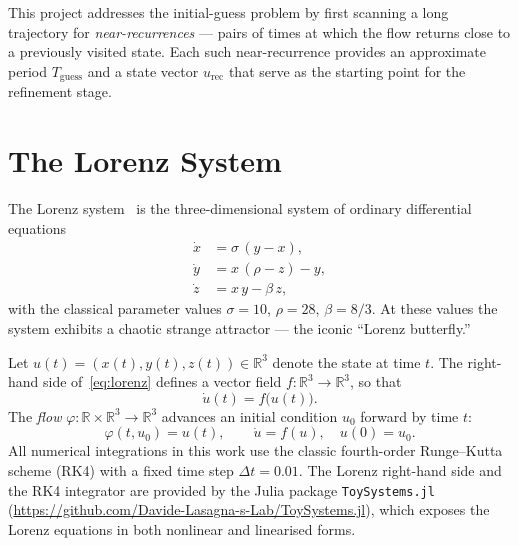 \documentclass[11pt,a4paper]{article}
\begin{document}
This project addresses the initial-guess problem by first scanning a long
trajectory for \emph{near-recurrences} --- pairs of times at which the flow
returns close to a previously visited state.  Each such near-recurrence
provides an approximate period $T_{\text{guess}}$ and a state vector
$u_{\text{rec}}$ that serve as the starting point for the refinement
stage.

\section{The Lorenz System}

The Lorenz system~\cite{lorenz1963deterministic} is the three-dimensional
system of ordinary differential equations
\begin{equation}\label{eq:lorenz}
\begin{aligned}
  \dot{x} &= \sigma\,(y - x), \\
  \dot{y} &= x\,(\rho - z) - y, \\
  \dot{z} &= x\,y - \beta\,z,
\end{aligned}
\end{equation}
with the classical parameter values $\sigma = 10$, $\rho = 28$,
$\beta = 8/3$.  At these values the system exhibits a chaotic strange
attractor --- the iconic ``Lorenz butterfly.''

Let $u(t) = (x(t), y(t), z(t)) \in \mathbb{R}^3$ denote
the state at time $t$.  The right-hand side of~\eqref{eq:lorenz} defines a
vector field $f: \mathbb{R}^3 \to \mathbb{R}^3$, so that
\begin{equation}
  \dot{u}(t) = f\bigl(u(t)\bigr).
\end{equation}
The \emph{flow} $\varphi: \mathbb{R} \times \mathbb{R}^3 \to \mathbb{R}^3$ advances an
initial condition $u_0$ forward by time $t$:
\begin{equation}
  \varphi(t, u_0) = u(t),
  \qquad \dot{u} = f(u), \quad u(0) = u_0.
\end{equation}
All numerical integrations in this work use the classic fourth-order
Runge--Kutta scheme (RK4) with a fixed time step $\Delta t = 0.01$.
The Lorenz right-hand side and the RK4 integrator are provided by the
Julia package \texttt{ToySystems.jl}
(\url{https://github.com/Davide-Lasagna-s-Lab/ToySystems.jl}),
which exposes the Lorenz equations in both nonlinear and linearised forms.
\end{document}
